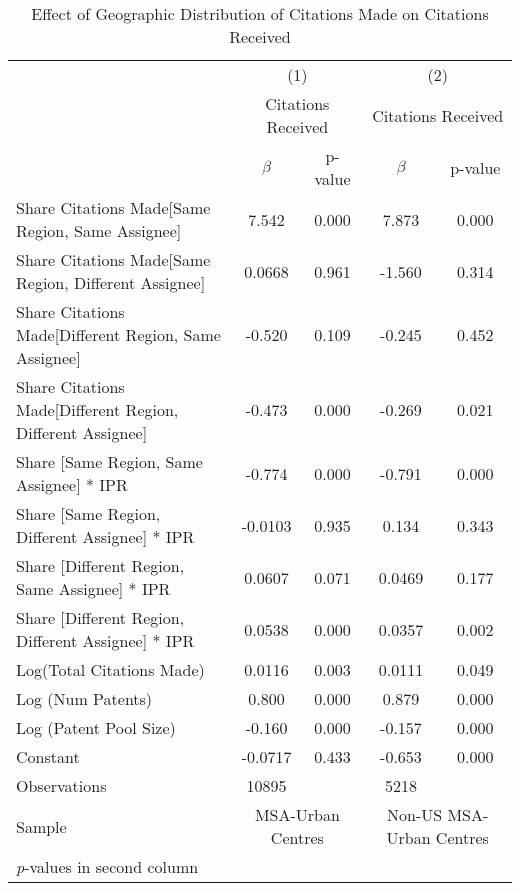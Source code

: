 {
\begin{longtable}{l*{2}{cc}}
\caption{Effect of Geographic Distribution of Citations Made on Citations Received \label{model34}}\\
\hline\hline\endfirsthead\hline\endhead\hline\endfoot\endlastfoot
                &\multicolumn{2}{c}{(1)}&\multicolumn{2}{c}{(2)}\\
                &\multicolumn{2}{c}{Citations Received}&\multicolumn{2}{c}{Citations Received}\\
                &$\beta$&p-value&$\beta$&p-value\\                
\hline
Share Citations Made[Same Region, Same Assignee]&    7.542&    0.000&    7.873&    0.000\\
Share Citations Made[Same Region, Different Assignee]&   0.0668&    0.961&   -1.560&    0.314\\
Share Citations Made[Different Region, Same Assignee]&   -0.520&    0.109&   -0.245&    0.452\\
Share Citations Made[Different Region, Different Assignee]&   -0.473&    0.000&   -0.269&    0.021\\
Share [Same Region, Same Assignee] * IPR&   -0.774&    0.000&   -0.791&    0.000\\
Share [Same Region, Different Assignee] * IPR&  -0.0103&    0.935&    0.134&    0.343\\
Share [Different Region, Same Assignee] * IPR&   0.0607&    0.071&   0.0469&    0.177\\
Share [Different Region, Different Assignee] * IPR&   0.0538&    0.000&   0.0357&    0.002\\
Log(Total Citations Made)&   0.0116&    0.003&   0.0111&    0.049\\
Log (Num Patents)&    0.800&    0.000&    0.879&    0.000\\
Log (Patent Pool Size)&   -0.160&    0.000&   -0.157&    0.000\\
Constant        &  -0.0717&    0.433&   -0.653&    0.000\\
\hline
Observations    &    10895&         &     5218&         \\
Sample          &\multicolumn{2}{c}{MSA-Urban Centres}&\multicolumn{2}{c}{Non-US MSA-Urban Centres}         \\
\hline\hline
\multicolumn{5}{l}{\footnotesize \textit{p}-values in second column}\\
\end{longtable}
}
